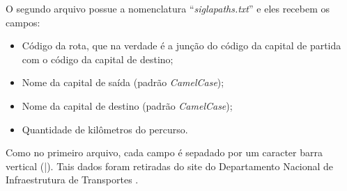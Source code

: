 O segundo arquivo possue a nomenclatura ``\textit{sigla\underline{\hspace{.1in}}paths.txt}'' e eles recebem os campos:

\begin{itemize}
	\item Código da rota, que na verdade é a junção do código da capital de partida com o código da capital de destino;
	\item Nome da capital de saída (padrão \textit{CamelCase});
	\item Nome da capital de destino (padrão \textit{CamelCase});
	\item Quantidade de kilômetros do percurso.
\end{itemize}

Como no primeiro arquivo, cada campo é sepadado por um caracter barra vertical (|). Tais dados foram retiradas do site do Departamento Nacional de Infraestrutura de Transportes \cite{DNIT}.
